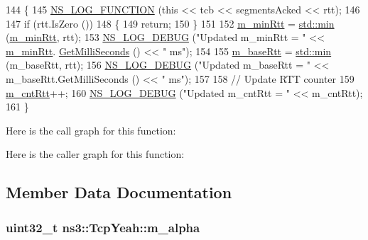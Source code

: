 \begin{DoxyCode}
144 \{
145   \hyperlink{log-macros-disabled_8h_a90b90d5bad1f39cb1b64923ea94c0761}{NS\_LOG\_FUNCTION} (\textcolor{keyword}{this} << tcb << segmentsAcked << rtt);
146 
147   \textcolor{keywordflow}{if} (rtt.IsZero ())
148     \{
149       \textcolor{keywordflow}{return};
150     \}
151 
152   \hyperlink{classns3_1_1TcpYeah_a03797ee01437476f042a2532916eeb34}{m\_minRtt} = \hyperlink{80211b_8c_ac6afabdc09a49a433ee19d8a9486056d}{std::min} (\hyperlink{classns3_1_1TcpYeah_a03797ee01437476f042a2532916eeb34}{m\_minRtt}, rtt);
153   \hyperlink{group__logging_ga413f1886406d49f59a6a0a89b77b4d0a}{NS\_LOG\_DEBUG} (\textcolor{stringliteral}{"Updated m\_minRtt = "} << \hyperlink{classns3_1_1TcpYeah_a03797ee01437476f042a2532916eeb34}{m\_minRtt}.
      \hyperlink{classns3_1_1Time_aba3428a8b6c4c8d9014ce44145081f34}{GetMilliSeconds} () << \textcolor{stringliteral}{" ms"});
154 
155   \hyperlink{classns3_1_1TcpYeah_ae5be5385c3024374ff24843e70cde080}{m\_baseRtt} = \hyperlink{80211b_8c_ac6afabdc09a49a433ee19d8a9486056d}{std::min} (m\_baseRtt, rtt);
156   \hyperlink{group__logging_ga413f1886406d49f59a6a0a89b77b4d0a}{NS\_LOG\_DEBUG} (\textcolor{stringliteral}{"Updated m\_baseRtt = "} << m\_baseRtt.GetMilliSeconds () << \textcolor{stringliteral}{" ms"});
157 
158   \textcolor{comment}{// Update RTT counter}
159   \hyperlink{classns3_1_1TcpYeah_a3040af9006b6237f1c5aa012aba3858a}{m\_cntRtt}++;
160   \hyperlink{group__logging_ga413f1886406d49f59a6a0a89b77b4d0a}{NS\_LOG\_DEBUG} (\textcolor{stringliteral}{"Updated m\_cntRtt = "} << m\_cntRtt);
161 \}
\end{DoxyCode}


Here is the call graph for this function\+:




Here is the caller graph for this function\+:




\subsection{Member Data Documentation}
\subsubsection[{\texorpdfstring{m\+\_\+alpha}{m_alpha}}]{\setlength{\rightskip}{0pt plus 5cm}uint32\+\_\+t ns3\+::\+Tcp\+Yeah\+::m\+\_\+alpha\hspace{0.3cm}{\ttfamily [private]}}\hypertarget{classns3_1_1TcpYeah_aa61ce240a53170a18b44144abe864def}{}\label{classns3_1_1TcpYeah_aa61ce240a53170a18b44144abe864def}



